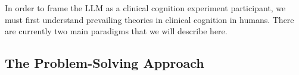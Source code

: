 In order to frame the LLM as a clinical cognition experiment participant, we must first understand prevailing theories in clinical cognition in humans. There are currently two main paradigms that we will describe here. 

\subsection{The Problem-Solving Approach}


